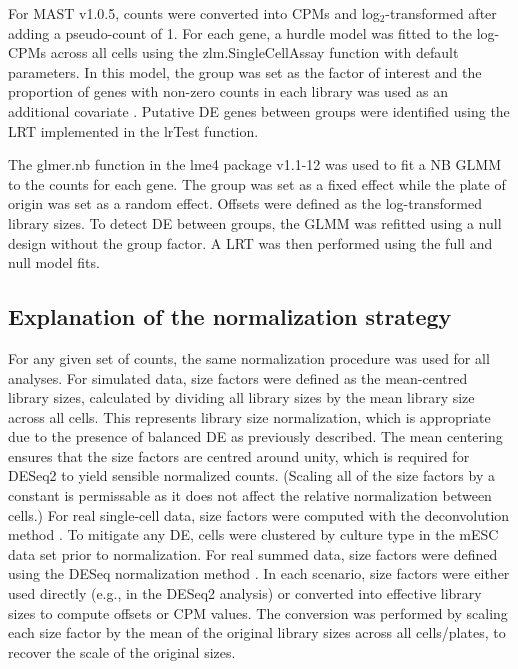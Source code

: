 \documentclass{article}
\newcommand\revised[1]{#1} %
\begin{document}
For MAST v1.0.5, counts were converted into CPMs and log$_2$-transformed after adding a pseudo-count of 1.
For each gene, a hurdle model was fitted to the log-CPMs across all cells \revised{using the zlm.SingleCellAssay function with default parameters.}
\revised{In this model}, the group was \revised{set} as the factor of interest and the proportion of genes with non-zero counts in each library was used as an additional covariate \citep{finak2015mast}.
Putative DE genes between groups were identified using the LRT \revised{implemented in the lrTest function.}

\revised{The glmer.nb function in the lme4 package v1.1-12 was used to fit a NB GLMM to the counts for each gene.
The group was set as a fixed effect while the plate of origin was set as a random effect.
Offsets were defined as the log-transformed library sizes.
To detect DE between groups, the GLMM was refitted using a null design without the group factor.
A LRT was then performed using the full and null model fits.}

\subsection{Explanation of the normalization strategy}
For any given set of counts, the same normalization procedure was used for all analyses.
For simulated data, size factors were defined as the mean-centred library sizes, calculated by dividing all library sizes by the mean library size across all cells.
This represents library size normalization, which is appropriate due to the presence of balanced DE as previously described.
The mean centering ensures that the size factors are centred around unity, which is required for DESeq2 to yield sensible normalized counts.
(Scaling all of the size factors by a constant is permissable as it does not affect the relative normalization between cells.)
For real single-cell data, size factors were computed with the deconvolution method \citep{lun2016pooling}.
To mitigate any DE, cells were clustered by culture type in the mESC data set prior to normalization.
For real summed data, size factors were defined using the DESeq normalization method \citep{anders2010differential}.
In each scenario, size factors were either used directly (e.g., in the DESeq2 analysis) or converted into effective library sizes to compute offsets or CPM values.
The conversion was performed by scaling each size factor by the mean of the original library sizes across all cells/plates, to recover the scale of the original sizes.
\end{document}
